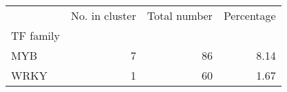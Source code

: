 \begin{tabular}{lrrr}
\toprule
{} &  No. in cluster &  Total number &  Percentage \\
TF family &                 &               &             \\
\midrule
MYB       &               7 &            86 &        8.14 \\
WRKY      &               1 &            60 &        1.67 \\
\bottomrule
\end{tabular}
